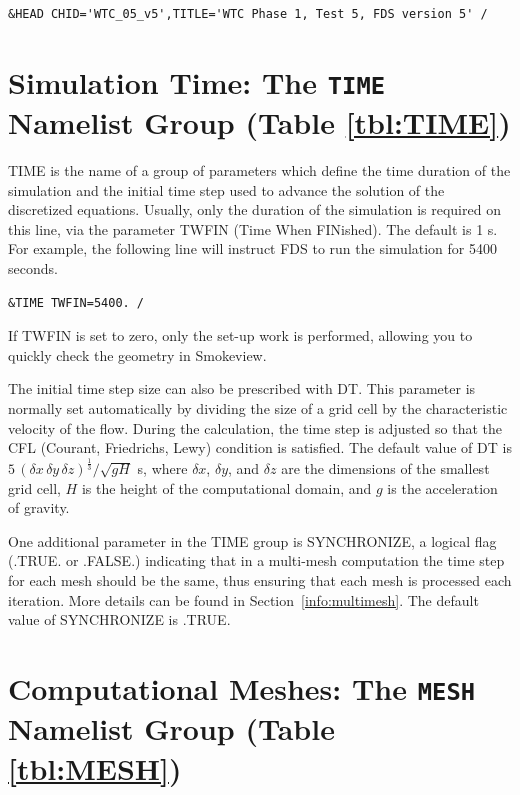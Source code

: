 \documentclass[11pt]{book}
\newcommand{\dx}{\delta x}
\newcommand{\dy}{\delta y}
\newcommand{\dz}{\delta z}
\newcommand{\ot}{\frac{1}{3}}
\begin{document}
\footnotesize
\begin{verbatim}
&HEAD CHID='WTC_05_v5',TITLE='WTC Phase 1, Test 5, FDS version 5' /
\end{verbatim}
\normalsize

\section{Simulation Time: The \texorpdfstring{{\tt TIME}}{TIME} Namelist Group (Table \ref{tbl:TIME})}%
\label{info:TIME}

{\ct TIME} is the name of a group of parameters which define the time
duration of the simulation and the initial time step used to advance
the solution of the discretized equations. Usually, only the
duration of the simulation is required on this line, via the
parameter {\ct TWFIN} (Time When FINished). The default is 1 s.
For example, the following line will instruct FDS to run the simulation for 5400 seconds.

\footnotesize
\begin{verbatim}
&TIME TWFIN=5400. /
\end{verbatim}
\normalsize
If {\ct TWFIN} is set to zero, only the set-up work is
performed, allowing you to quickly check the geometry in
Smokeview.

The initial time step size can also be prescribed with
{\ct DT}. This parameter is normally set automatically by dividing the size of a grid cell by the
characteristic velocity of the flow.
During the calculation, the time step is adjusted so that the CFL (Courant, Friedrichs, Lewy) condition is
satisfied. The default value of {\ct DT} is $5 \, (\dx \, \dy \, \dz)^\ot/\sqrt{gH}$ s, where
$\dx$, $\dy$, and $\dz$ are the dimensions of the smallest grid
cell, $H$ is the height of the computational domain, and $g$ is the acceleration of gravity.

One additional parameter in the {\ct TIME} group is {\ct SYNCHRONIZE}, a
logical flag ({\ct .TRUE.} or {\ct .FALSE.}) indicating that in a
multi-mesh computation the time step for each mesh should be the same, thus
ensuring that each mesh is processed each iteration. More details can
be found in Section~\ref{info:multimesh}. The default value of {\ct SYNCHRONIZE} is {\ct .TRUE.}

\newpage

\section{Computational Meshes: The \texorpdfstring{{\tt MESH}}{MESH} Namelist Group (Table \ref{tbl:MESH})}
\label{info:MESH}
\end{document}
